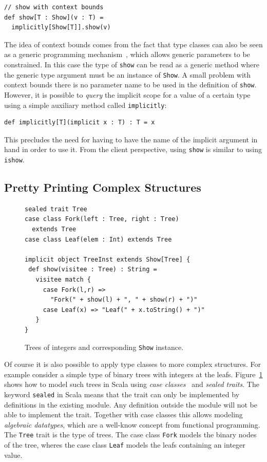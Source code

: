 \documentclass[preprint]{sigplanconf}
\begin{document}
\begin{lstlisting}
// show with context bounds
def show[T : Show](v : T) =
  implicitly[Show[T]].show(v)
\end{lstlisting}

The idea of context bounds comes from the fact that type classes can
also be seen as a generic programming mechanism~\cite{}, which allows
generic parameters to be constrained. In this case the type of
\lstinline{show} can be read as a generic method where the generic
type argument must be an instance of \lstinline{Show}.
A small problem with context bounds there is no parameter name to be used in the
definition of \lstinline{show}. However, it is possible to
\emph{query} the implicit scope for a value of a certain type
using a simple auxiliary method called \lstinline{implicitly}:

\begin{lstlisting}
def implicitly[T](implicit x : T) : T = x
\end{lstlisting}

This precludes the need for having to have the name of the implicit
argument in hand in order to use it.
From the client perspective, using \lstinline{show} is similar to
using \lstinline{ishow}.

\subsection{Pretty Printing Complex Structures}\label{sec:pretty-printing-complex}

\begin{figure}
\begin{lstlisting}
sealed trait Tree
case class Fork(left : Tree, right : Tree)
  extends Tree
case class Leaf(elem : Int) extends Tree

implicit object TreeInst extends Show[Tree] {
 def show(visitee : Tree) : String =
   visitee match {
     case Fork(l,r) =>
       "Fork(" + show(l) + ", " + show(r) + ")"
     case Leaf(x) => "Leaf(" + x.toString() + ")"
   }
}
\end{lstlisting}
\caption{Trees of integers and corresponding \lstinline{Show}
  instance.}
\label{fig:trees}
\end{figure}

Of course it is also possible to apply type classes to more complex
structures. For example consider a simple type of binary trees with
integers at the leafs. Figure~\ref{fig:trees} shows how to model such
trees in Scala using \emph{case classes}~\cite{} and \emph{sealed
  traits}. The keyword \lstinline{sealed} in Scala means that the
trait can only be implemented by definitions in the existing module.
Any definition outside the module will not be able to implement the
trait. Together with case classes this allows modeling \emph{algebraic
  datatypes}, which are a well-know concept from functional programming.
The \lstinline{Tree} trait is the type of trees. The case class
\lstinline{Fork} models the binary nodes of the tree, wheres the case
class \lstinline{Leaf} models the leafs containing an integer value.
\end{document}
